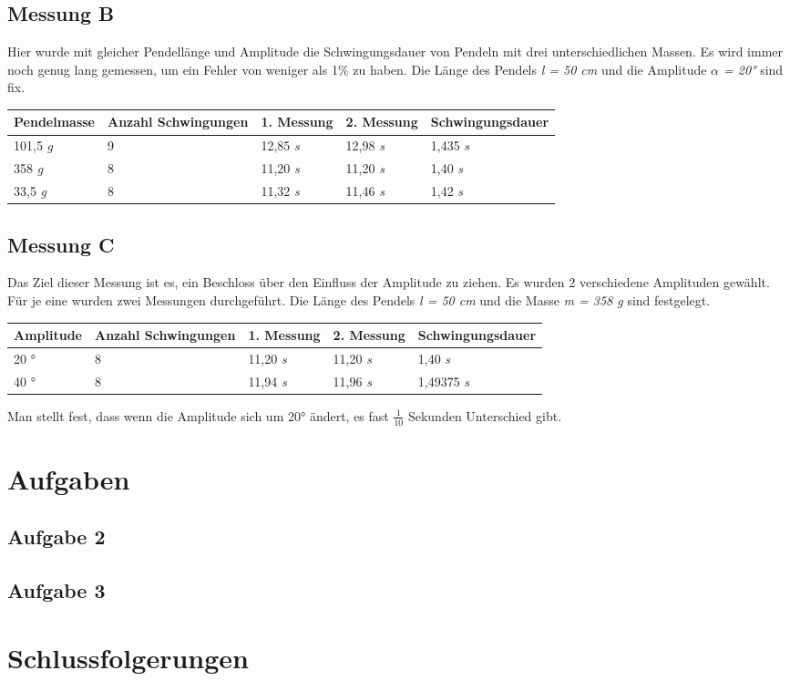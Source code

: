 \documentclass{report}
\begin{document}
    \section*{Messung B}
    Hier wurde mit gleicher Pendellänge und Amplitude die Schwingungsdauer von Pendeln mit drei unterschiedlichen Massen. Es wird immer noch genug lang gemessen, um ein Fehler von weniger als 1\% zu haben.
    Die Länge des Pendels \textit{l = 50 cm} und die Amplitude \textit{$\alpha$ = 20°} sind fix.
    \begin{center}
        \begin{tabular}{| m{5em} | m{4cm} | m{2cm} | m{2cm} | m{3cm} | }
            \hline
            Pendelmasse & Anzahl Schwingungen & 1. Messung & 2. Messung & Schwingungsdauer\\
            \hline
            101,5 \textit{g} & 9 & 12,85 \textit{s} & 12,98 \textit{s} & 1,435 \textit{s}\\
            \hline
            358 \textit{g} & 8 & 11,20 \textit{s} & 11,20 \textit{s} & 1,40 \textit{s}\\
            \hline
            33,5 \textit{g} & 8 & 11,32 \textit{s} & 11,46 \textit{s} & 1,42 \textit{s}\\
            \hline
        \end{tabular}
    \end{center}
    \section*{Messung C}
    Das Ziel dieser Messung ist es, ein Beschloss über den Einfluss der Amplitude zu ziehen. Es wurden 2 verschiedene Amplituden gewählt. Für je eine wurden zwei Messungen durchgeführt. Die Länge des Pendels \textit{l = 50 cm} und die Masse \textit{m = 358 g} sind festgelegt.
    \begin{center}
        \begin{tabular}{ | m{5em} | m{4cm} | m{2cm} | m{2cm} | m{3cm} | }
            \hline
            Amplitude & Anzahl Schwingungen & 1. Messung & 2. Messung & Schwingungsdauer\\
            \hline
            20 ° & 8 & 11,20 \textit{s} & 11,20 \textit{s} & 1,40 \textit{s}\\
            \hline
            40 ° & 8 & 11,94 \textit{s} & 11,96 \textit{s} & 1,49375 \textit{s}\\
            \hline
        \end{tabular}
    \end{center}
    Man stellt fest, dass wenn die Amplitude sich um 20° ändert, es fast $\frac{1}{10}$ Sekunden Unterschied gibt.
    \chapter*{Aufgaben}
    \section*{Aufgabe 2}
    \section*{Aufgabe 3}
    \chapter*{Schlussfolgerungen}
\end{document}

